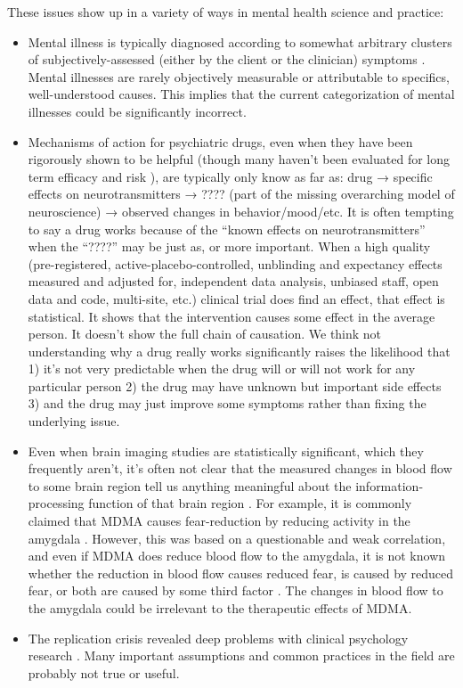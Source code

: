 \documentclass[12pt,letterpaper]{book}
\begin{document}
These issues show up in a variety of ways in mental health science and practice:
\begin{itemize}
    \item Mental illness is typically diagnosed according to somewhat arbitrary clusters of subjectively-assessed (either by the client or the clinician) symptoms \cite{apaDSM}. Mental illnesses are rarely objectively measurable or attributable to specifics, well-understood causes. This implies that the current categorization of mental illnesses could be significantly incorrect.
    \item Mechanisms of action for psychiatric drugs, even when they have been rigorously shown to be helpful (though many haven’t been evaluated for long term efficacy and risk \cite{leuchtDecline}), are typically only know as far as: drug → specific effects on neurotransmitters → ???? (part of the missing overarching model of neuroscience) → observed changes in behavior/mood/etc. It is often tempting to say a drug works because of the “known effects on neurotransmitters” when the “????” may be just as, or more important. When a high quality (pre-registered, active-placebo-controlled, unblinding and expectancy effects measured and adjusted for, independent data analysis, unbiased staff, open data and code, multi-site, etc.) clinical trial does find an effect, that effect is statistical. It shows that the intervention causes some effect in the average person. It doesn’t show the full chain of causation. We think not understanding why a drug really works significantly raises the likelihood that 1) it's not very predictable when the drug will or will not work for any particular person 2) the drug may have unknown but important side effects 3) and the drug may just improve some symptoms rather than fixing the underlying issue.
    \item Even when brain imaging studies are statistically significant, which they frequently aren't, it's often not clear that the measured changes in blood flow to some brain region tell us anything meaningful about the information-processing function of that brain region \cite{jonas2017microprocessor,dewit2016neuroimaging,alikoEntireBrain}. For example, it is commonly claimed that MDMA causes fear-reduction by reducing activity in the amygdala \cite{fedduciaMDMAMemoryReconsolidation}. However, this was based on a questionable and weak correlation, and even if MDMA does reduce blood flow to the amygdala, it is not known whether the reduction in blood flow causes reduced fear, is caused by reduced fear, or both are caused by some third factor \cite{mdmaNeuroimaging}. The changes in blood flow to the amygdala could be irrelevant to the therapeutic effects of MDMA.
    \item The replication crisis revealed deep problems with clinical psychology research \cite{therapyReplicationCrisis}. Many important assumptions and common practices in the field are probably not true or useful.
\end{itemize}
\end{document}
